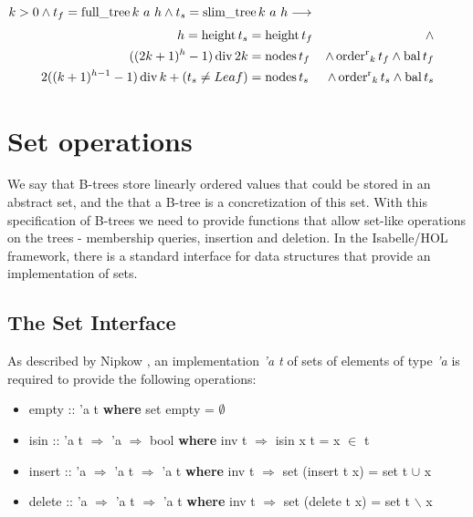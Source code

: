 \begin{theorem}
    $k > 0 \wedge t_f = \operatorname{full\_tree} k\ a\ h \wedge t_s = \operatorname{slim\_tree} k\ a\ h \longrightarrow$
    \begin{align*}
    h = \operatorname{height} t_s &= \operatorname{height} t_f &\wedge \\
        ((2k+1)^h - 1) \operatorname{div} 2k &= \operatorname{nodes} t_f &\wedge \operatorname{order^r}_k t_f \wedge \operatorname{bal} t_f \\ 
        2((k+1)^{h-1} - 1) \operatorname{div} k + (t_s \neq Leaf) &= \operatorname{nodes} t_s &\wedge \operatorname{order^r}_k t_s \wedge \operatorname{bal} t_s
    \end{align*}
\end{theorem}


\section{Set operations}

We say that B-trees store linearly ordered values
that could be stored in an abstract set,
and the that a B-tree is a concretization
of this set.
With this specification of B-trees we need to provide functions that allow
set-like operations on the trees -
membership queries, insertion and deletion.
In the Isabelle/HOL framework, there is a standard interface
for data structures that provide an implementation of sets.

\subsection{The Set Interface}

As described by Nipkow \parencite{DBLP:conf/itp/Nipkow16},
an implementation \textit{'a t} of sets of elements of type \textit{'a} is required to provide the following
operations:

\begin{itemize}
    \itshape
    \item empty :: 'a t \textup{\textbf{where}} set empty = $\emptyset$
    \item isin :: 'a t $\Rightarrow$ 'a $\Rightarrow$ bool \textup{\textbf{where}} inv t $\Longrightarrow$ isin x t = x $\in$ t
    \item insert :: 'a $\Rightarrow$ 'a t $\Rightarrow$ 'a t \textup{\textbf{where}} inv t $\Longrightarrow$ set (insert t x) = set t $\cup$ {x}
    \item delete :: 'a $\Rightarrow$ 'a t $\Rightarrow$ 'a t \textup{\textbf{where}} inv t $\Longrightarrow$ set (delete t x) = set t $\backslash$ {x}
\end{itemize}

